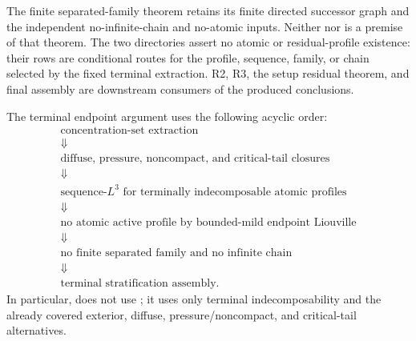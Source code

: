 \documentclass[11pt]{amsart}
\numberwithin{equation}{section}
\theoremstyle{plain}
\theoremstyle{definition}
\theoremstyle{remark}
\begin{document}
The finite separated-family theorem retains its finite directed successor
graph and the independent no-infinite-chain and no-atomic inputs.  Neither
 nor
 is a premise of that theorem.  The two
directories assert no atomic or residual-profile existence: their rows are
conditional routes for the profile, sequence, family, or chain selected by the
fixed terminal extraction.  R2, R3, the setup residual theorem, and final
assembly are downstream consumers of the produced conclusions.

The terminal endpoint argument uses the following acyclic order:
\[
\begin{array}{c}
\text{concentration-set extraction}\\
\Downarrow\\
\text{diffuse, pressure, noncompact, and critical-tail closures}\\
\Downarrow\\
\text{sequence-}L^3\text{ for terminally indecomposable atomic profiles}\\
\Downarrow\\
\text{no atomic active profile by bounded-mild endpoint Liouville}\\
\Downarrow\\
\text{no finite separated family and no infinite chain}\\
\Downarrow\\
\text{terminal stratification assembly.}
\end{array}
\]
In particular,  does not use
; it uses only terminal indecomposability and
the already covered exterior, diffuse, pressure/noncompact, and critical-tail
alternatives.
\end{document}
